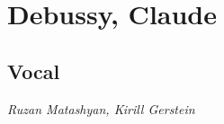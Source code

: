 \chapter{Debussy, Claude} %
\label{cha:debussy}

\section{Vocal}

 \textit{Ruzan Matashyan, Kirill Gerstein}  